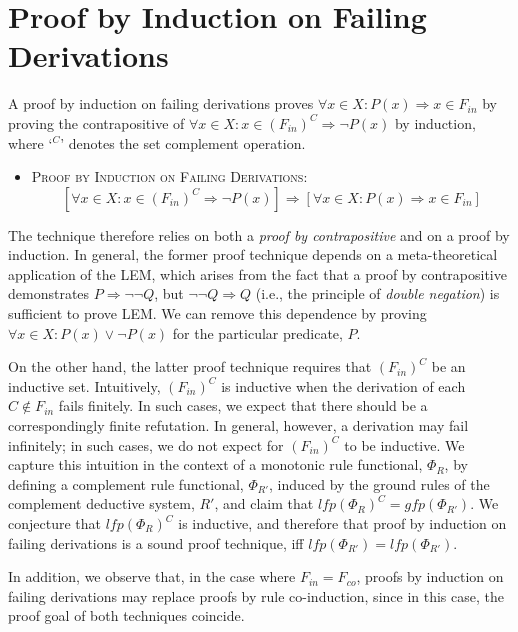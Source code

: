 \section{Proof by Induction on Failing Derivations}
\label{sec-failing}
A proof by induction on failing derivations proves $\forall x \in X: P(x) \Rightarrow x \in F_{in}$ by proving the contrapositive of $\forall x \in X: x \in (F_{in})^C \Rightarrow \lnot P(x)$ by induction, where `$^C$' denotes the set complement operation.

\begin{itemize}
\item \textsc{Proof by Induction on Failing Derivations}:
$$[\forall x \in X: x \in (F_{in})^C \Rightarrow \lnot P(x)] \Rightarrow [\forall x \in X: P(x) \Rightarrow x \in F_{in}]$$
\end{itemize}

The technique therefore relies on both a \textit{proof by contrapositive} and on a proof by induction. In general, the former proof technique depends on a meta-theoretical application of the LEM, which arises from the fact that a proof by contrapositive demonstrates $P \Rightarrow \lnot \lnot Q$, but $\lnot\lnot Q \Rightarrow Q$ (i.e., the principle of \textit{double negation}) is sufficient to prove LEM. We can remove this dependence by proving $\forall x \in X: P(x) \vee \lnot P(x)$ for the particular predicate, $P$. 

On the other hand, the latter proof technique requires that $(F_{in})^C$ be an inductive set. Intuitively, $(F_{in})^C$ is inductive when the derivation of each $C \not\in F_{in}$ fails finitely. In such cases, we expect that there should be a correspondingly finite refutation. In general, however, a derivation may fail infinitely; in such cases, we do not expect for $(F_{in})^C$ to be inductive. We capture this intuition in the context of a monotonic rule functional, $\Phi_R$, by defining a complement rule functional, $\Phi_{R'}$, induced by the ground rules of the complement deductive system, $R'$, and claim that $lfp(\Phi_R)^C = gfp(\Phi_{R'})$. We conjecture that $lfp(\Phi_R)^C$ is inductive, and therefore that proof by induction on failing derivations is a sound proof technique, iff $lfp(\Phi_{R'}) = lfp(\Phi_{R'})$.

In addition, we observe that, in the case where $F_{in} = F_{co}$, proofs by induction on failing derivations may replace proofs by rule co-induction, since in this case, the proof goal of both techniques coincide.

